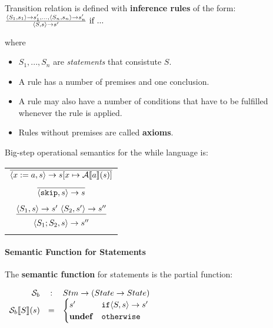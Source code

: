 Transition relation is defined with \textbf{inference rules} of the
form:
\\

\begin{math}
\frac{ \langle  S_1, s_1 \rangle \to s_1', ..., \langle  S_n, s_n \rangle \to s_n' }
{ \langle S, s \rangle \to s' }
\text{ if ... }
\end{math}

where

\begin{itemize}
\item $ S_1, ..., S_n $ are \textsl{statements} that consistute $ S $.
\item A rule has a number of premises and one conclusion.
\item A rule may also have a number of conditions that have to be
  fulfilled whenever the rule is applied.
\item Rules without premises are called \textbf{axioms}.
\end{itemize}

Big-step operational semantics for the while language is:


\begin{tabularx}{\textwidth}{c}
\\
$ \overline{ \langle  x := a, s  \rangle \to s [ x \mapsto \mathcal{A}\llbracket a \rrbracket(s) ] } $\\
\\
$ \overline{ \langle  \mathtt{skip}, s \rangle \to s } $\\
\\

$ \underline{ \langle S_1, s \rangle \to s' \text{   } \langle S_2, s' \rangle \to s''} $ \\
$ \langle S_1;S_2, s \rangle \to s'' $ \\
\\

\end{tabularx}


\paragraph{Semantic Function for Statements}

The \textbf{semantic function} for statements is the partial function:

\begin{math}
  \begin{array}{rcl}
    \mathcal{S}_b & : & Stm \to ( State \to State) \\
    \mathcal{S}_b \llbracket S \rrbracket (s) & = &
                                    \begin{cases}
                                      s' & \mathtt{if} \langle S, s \rangle \to s' \\
                                      \mathbf{undef} & \mathtt{otherwise}
                                    \end{cases}

  \end{array}
\end{math}


